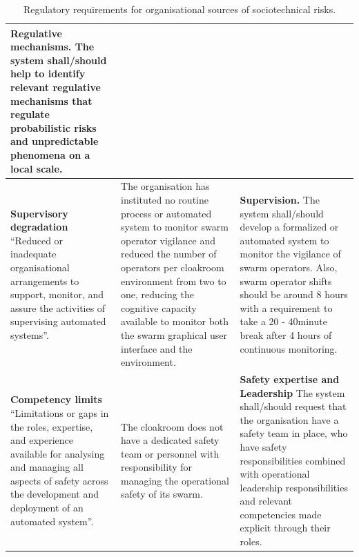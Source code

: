 \documentclass[lettersize,journal]{IEEEtran}
\begin{document}
\begin{landscape}
\begin{table}[]
\begin{tabular}{|p{0.3\textheight}|p{0.35\textheight}|p{0.35\textheight}|}
   \textbf{Regulative mechanisms.} The system shall/should help to identify relevant regulative mechanisms that regulate probabilistic risks and unpredictable phenomena on a local scale. \\
   \hline
   \textbf{Supervisory degradation} ``Reduced or inadequate organisational arrangements to support, monitor, and assure the activities of supervising automated systems”. \cite{macrae2021learning} & The organisation has instituted no routine process or automated system to monitor swarm operator vigilance and reduced the number of operators per cloakroom environment from two to one, reducing the cognitive capacity available to monitor both the swarm graphical user interface and the environment. &	\textbf{Supervision.} The system shall/should develop a formalized or automated system to monitor the vigilance of swarm operators. Also, swarm operator shifts should be around 8 hours with a requirement to take a 20 - 40minute break after 4 hours of continuous monitoring. \\
   \hline
   \textbf{Competency limits} ``Limitations or gaps in the roles, expertise, and experience available for analysing and managing all aspects of safety across the development and deployment of an automated system”. \cite{macrae2021learning} & The cloakroom does not have a dedicated safety team or personnel with responsibility for managing the operational safety of its swarm. & \textbf{Safety expertise and Leadership} The system shall/should request that the organisation have a safety team in place, who have safety responsibilities combined with operational leadership responsibilities and relevant competencies made explicit through their roles.\\
   \hline
    \end{tabular}
    \caption{Regulatory requirements for organisational sources of sociotechnical risks.}%
    \label{tab:reg_2}
\end{table}
\end{landscape}
\end{document}
